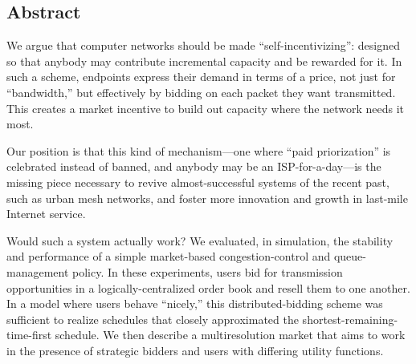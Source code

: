 \subsection*{Abstract}
We argue that computer networks should be made ``self-incentivizing'':
designed so that anybody may contribute incremental capacity and be
rewarded for it. In such a scheme, endpoints express their demand in
terms of a price, not just for ``bandwidth,'' but effectively by
bidding on each packet they want transmitted. This creates a market
incentive to build out capacity where the network needs it most.

Our position is that this kind of mechanism---one where ``paid
priorization'' is celebrated instead of banned, and anybody may be an
ISP-for-a-day---is the missing piece necessary to revive
almost-successful systems of the recent past, such as urban mesh
networks, and foster more innovation and growth in last-mile Internet service.

Would such a system actually work? We evaluated, in simulation, the
stability and performance of a simple market-based congestion-control and queue-management
policy. In these experiments, users bid for
transmission opportunities in a logically-centralized order book and
resell them to one another. In a model where users behave ``nicely,''
this distributed-bidding scheme was sufficient to realize schedules
that closely approximated the shortest-remaining-time-first
schedule. We then describe a multiresolution market that aims
to work in the presence of strategic bidders and users with
differing utility functions.
